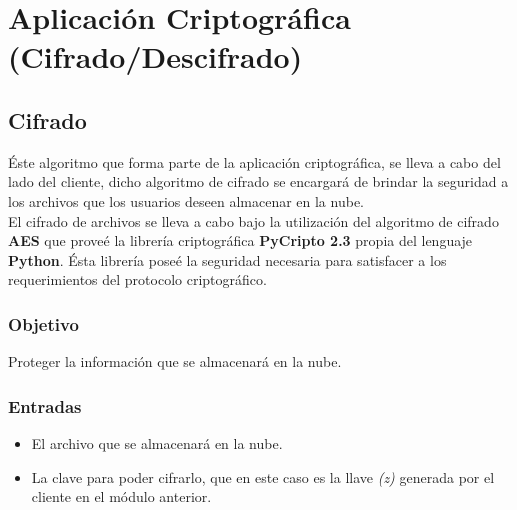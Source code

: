 



\section{Aplicación Criptográfica (Cifrado/Descifrado)}


\subsection{Cifrado}
Éste algoritmo que forma parte de la aplicación criptográfica, se lleva a cabo del lado del cliente, dicho algoritmo de cifrado se encargará de brindar la seguridad a los archivos que los usuarios deseen almacenar en la nube. \\
El cifrado de archivos se lleva a cabo bajo la utilización del algoritmo de cifrado \textbf{AES} que proveé la librería criptográfica \textbf{PyCripto 2.3} propia del lenguaje \textbf{Python}. Ésta librería poseé la seguridad necesaria para satisfacer a los requerimientos del protocolo criptográfico.  \\ 

\subsubsection{Objetivo}
Proteger la información que se almacenará en la nube.

\subsubsection{Entradas}
	\begin{itemize}
		\item El archivo que se almacenará en la nube.
		\item La clave para poder cifrarlo, que en este caso es la llave \textit{(z)} generada por el cliente en el módulo anterior. 
	\end{itemize}

